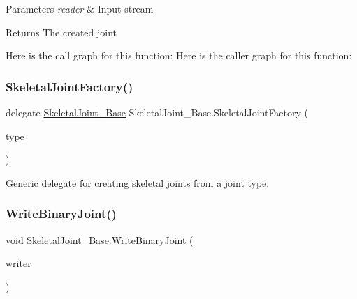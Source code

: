 \begin{DoxyParams}{Parameters}
{\em reader} & Input stream\\
\hline
\end{DoxyParams}
\begin{DoxyReturn}{Returns}
The created joint
\end{DoxyReturn}
Here is the call graph for this function\+:
Here is the caller graph for this function\+:
\mbox{\label{class_skeletal_joint___base_aac5116bb70fb19058943811a19951848}} 
\subsubsection{\texorpdfstring{Skeletal\+Joint\+Factory()}{SkeletalJointFactory()}}
{\footnotesize\ttfamily delegate \hyperlink{class_skeletal_joint___base}{Skeletal\+Joint\+\_\+\+Base} Skeletal\+Joint\+\_\+\+Base.\+Skeletal\+Joint\+Factory (\begin{DoxyParamCaption}\item[{Skeletal\+Joint\+Type}]{type }\end{DoxyParamCaption})}



Generic delegate for creating skeletal joints from a joint type. 

\mbox{\label{class_skeletal_joint___base_a42df720cdd871ccad5930ae7977f7200}} 
\subsubsection{\texorpdfstring{Write\+Binary\+Joint()}{WriteBinaryJoint()}}
{\footnotesize\ttfamily void Skeletal\+Joint\+\_\+\+Base.\+Write\+Binary\+Joint (\begin{DoxyParamCaption}\item[{System.\+I\+O.\+Binary\+Writer}]{writer }\end{DoxyParamCaption})}



